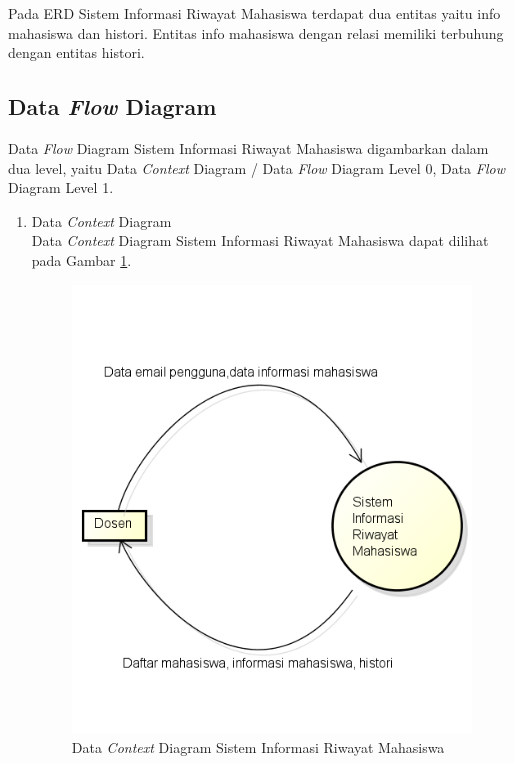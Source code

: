 Pada ERD Sistem Informasi Riwayat Mahasiswa terdapat dua entitas yaitu info
mahasiswa dan histori. Entitas info mahasiswa dengan relasi memiliki terbuhung
dengan entitas histori.

\subsection{Data {\it Flow} Diagram}
Data {\it Flow} Diagram Sistem Informasi Riwayat Mahasiswa digambarkan dalam dua
level, yaitu Data {\it Context} Diagram / Data {\it Flow} Diagram Level 0, Data
{\it Flow} Diagram Level 1.

\begin{enumerate}[(1)]
  \item Data {\it Context} Diagram\\
  Data {\it Context} Diagram Sistem Informasi Riwayat Mahasiswa dapat dilihat pada
  Gambar \ref{fig:dcd}.
  
\begin{figure}[H]
\centering
\includegraphics[scale=0.7]{Gambar/datacontextdiagram.png}
\caption[Data {\it Context} Diagram Sistem Informasi Riwayat Mahasiswa]{Data
{\it Context} Diagram Sistem Informasi Riwayat Mahasiswa}
\label{fig:dcd}
\end{figure}
  

\end{enumerate}
